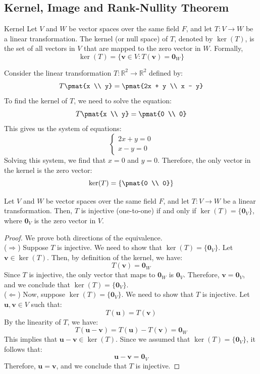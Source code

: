 \documentclass[openany]{book}
\begin{document}
\subsection{Kernel, Image and Rank-Nullity Theorem}
\begin{mydefinition}{Kernel}
    Let $V$ and $W$ be vector spaces over the same field $F$, and let $T: V \to W$ be a linear transformation. The kernel (or null space) of $T$, denoted by $\ker(T)$, is the set of all vectors in $V$ that are mapped to the zero vector in $W$. Formally,
    $$\ker(T) = \{\mathbf{v} \in V : T(\mathbf{v}) = \mathbf{0}_W\}$$
\end{mydefinition}
\begin{example}
    Consider the linear transformation $T: \mathbb{R}^2 \to \mathbb{R}^2$ defined by:
    $$T\pmat{x \\ y} = \pmat{2x + y \\ x - y}$$
    To find the kernel of $T$, we need to solve the equation:
    $$T\pmat{x \\ y} = \pmat{0 \\ 0}$$
    This gives us the system of equations:
    \[
    \begin{cases}
    2x + y = 0 \\
    x - y = 0
    \end{cases}
    \]
    Solving this system, we find that $x = 0$ and $y = 0$. Therefore, the only vector in the kernel is the zero vector:
    $$\ker(T) = \left\{\pmat{0 \\ 0}\right\}$$
\end{example}
\begin{mytheorem}
    Let $V$ and $W$ be vector spaces over the same field $F$, and let $T: V \to W$ be a linear transformation. Then, $T$ is injective (one-to-one) if and only if $\ker(T) = \{\mathbf{0}_V\}$, where $\mathbf{0}_V$ is the zero vector in $V$.
\end{mytheorem}
\begin{proof}
    We prove both directions of the equivalence. \\
    (\(\Rightarrow\)) Suppose $T$ is injective. We need to show that $\ker(T) = \{\mathbf{0}_V\}$. Let $\mathbf{v} \in \ker(T)$. Then, by definition of the kernel, we have:
    $$T(\mathbf{v}) = \mathbf{0}_W$$
    Since $T$ is injective, the only vector that maps to $\mathbf{0}_W$ is $\mathbf{0}_V$. Therefore, $\mathbf{v} = \mathbf{0}_V$, and we conclude that $\ker(T) = \{\mathbf{0}_V\}$. \\
    (\(\Leftarrow\)) Now, suppose $\ker(T) = \{\mathbf{0}_V\}$. We need to show that $T$ is injective. Let $\mathbf{u}, \mathbf{v} \in V$ such that:
    $$T(\mathbf{u}) = T(\mathbf{v})$$
    By the linearity of $T$, we have:
    $$T(\mathbf{u} - \mathbf{v}) = T(\mathbf{u}) - T(\mathbf{v}) = \mathbf{0}_W$$
    This implies that $\mathbf{u} - \mathbf{v} \in \ker(T)$. Since we assumed that $\ker(T) = \{\mathbf{0}_V\}$, it follows that:
    $$\mathbf{u} - \mathbf{v} = \mathbf{0}_V$$
    Therefore, $\mathbf{u} = \mathbf{v}$, and we conclude that $T$ is injective.
\end{proof}
\end{document}
